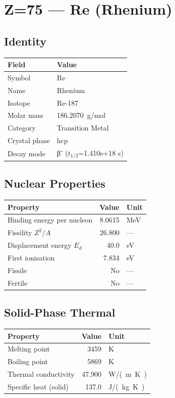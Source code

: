 \documentclass[11pt,a4paper]{article}
\begin{document}
\newpage

\section{Z=75 --- Re (Rhenium)}
\label{sec:Z75}

\subsection{Identity}
\begin{tabular}{ll}
  \toprule
  Field & Value \\
  \midrule
  Symbol & Re \\
  Name & Rhenium \\
  Isotope & Re-187 \\
  Molar mass & \SI{186.2070}{g/mol} \\
  Category & Transition Metal \\
  Crystal phase & hcp \\
  Decay mode & β⁻ ($t_{1/2}$=1.410e+18 s) \\
  \bottomrule
\end{tabular}

\subsection{Nuclear Properties}
\begin{tabular}{lrl}
  \toprule
  Property & Value & Unit \\
  \midrule
  Binding energy per nucleon & 8.0615 & \si{MeV} \\
  Fissility $Z^2/A$ & 26.800 & --- \\
  Displacement energy $E_d$ & 40.0 & \si{eV} \\
  First ionisation & 7.834 & \si{eV} \\
  Fissile & No & --- \\
  Fertile & No & --- \\
  \bottomrule
\end{tabular}

\subsection{Solid-Phase Thermal}
\begin{tabular}{lrl}
  \toprule
  Property & Value & Unit \\
  \midrule
  Melting point & 3459 & \si{K} \\
  Boiling point & 5869 & \si{K} \\
  Thermal conductivity & 47.900 & \si{W/(m.K)} \\
  Specific heat (solid) & 137.0 & \si{J/(kg.K)} \\
  \bottomrule
\end{tabular}
\end{document}
